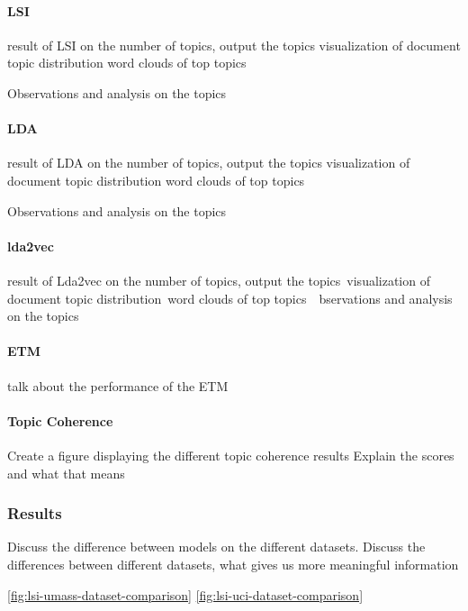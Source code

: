 \documentclass[letterpaper,12pt]{article}
\begin{document}
\newpage
\paragraph{LSI}
result of LSI on the number of topics, output the topics
visualization of document topic distribution
word clouds of top topics

Observations and analysis on the topics

\paragraph{LDA}
result of LDA on the number of topics, output the topics
visualization of document topic distribution
word clouds of top topics

Observations and analysis on the topics

\paragraph{lda2vec}
result of Lda2vec on the number of topics, output the topics\
visualization of document topic distribution\
word clouds of top topics\
\
bservations and analysis on the topics

\paragraph{ETM}

talk about the performance of the ETM

\paragraph{Topic Coherence}
Create a figure displaying the different topic coherence results
Explain the scores and what that means

\subsubsection{Results}
Discuss the difference between models on the different datasets.
Discuss the differences between different datasets, what gives us more meaningful information

\ref{fig:lsi-umass-dataset-comparison}
\ref{fig:lsi-uci-dataset-comparison}
\end{document}

